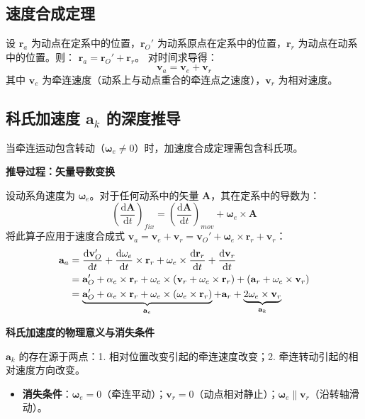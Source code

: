 \documentclass[12pt,a4paper]{article}
\newcommand{\vect}[1]{\mathbf{#1}}                   %
\newcommand{\der}[2]{\frac{\mathrm{d} #1}{\mathrm{d} #2}}  %
\begin{document}
\subsection{速度合成定理}
设 $\vect{r}_a$ 为动点在定系中的位置，$\vect{r}_O'$ 为动系原点在定系中的位置，$\vect{r}_r$ 为动点在动系中的位置。则：
$\vect{r}_a = \vect{r}_O' + \vect{r}_r$。
对时间求导得：
\begin{equation}
    \vect{v}_a = \vect{v}_e + \vect{v}_r
\end{equation}
其中 $\vect{v}_e$ 为牵连速度（动系上与动点重合的牵连点之速度），$\vect{v}_r$ 为相对速度。

\subsection{科氏加速度 $\vect{a}_k$ 的深度推导}

当牵连运动包含转动（$\vect{\omega}_e \neq 0$）时，加速度合成定理需包含科氏项。

\textbf{推导过程：矢量导数变换}

设动系角速度为 $\vect{\omega}_e$。对于任何动系中的矢量 $\vect{A}$，其在定系中的导数为：
\begin{equation}
    \left( \der{\vect{A}}{t} \right)_{fix} = \left( \der{\vect{A}}{t} \right)_{mov} + \vect{\omega}_e \times \vect{A}
\end{equation}
将此算子应用于速度合成式 $\vect{v}_a = \vect{v}_e + \vect{v}_r = \vect{v}_O' + \vect{\omega}_e \times \vect{r}_r + \vect{v}_r$：
\begin{align}
    \vect{a}_a &= \der{\vect{v}_O'}{t} + \der{\vect{\omega}_e}{t} \times \vect{r}_r + \vect{\omega}_e \times \der{\vect{r}_r}{t} + \der{\vect{v}_r}{t} \notag \\
    &= \vect{a}_O' + \vect{\alpha}_e \times \vect{r}_r + \vect{\omega}_e \times (\vect{v}_r + \vect{\omega}_e \times \vect{r}_r) + (\vect{a}_r + \vect{\omega}_e \times \vect{v}_r) \notag \\
    &= \underbrace{\vect{a}_O' + \vect{\alpha}_e \times \vect{r}_r + \vect{\omega}_e \times (\vect{\omega}_e \times \vect{r}_r)}_{\vect{a}_e} + \vect{a}_r + \underbrace{2\vect{\omega}_e \times \vect{v}_r}_{\vect{a}_k}
\end{align}

\textbf{科氏加速度的物理意义与消失条件}

$\vect{a}_k$ 的存在源于两点：1. 相对位置改变引起的牵连速度改变；2. 牵连转动引起的相对速度方向改变。
\begin{itemize}
    \item \textbf{消失条件}：$\vect{\omega}_e = 0$（牵连平动）；$\vect{v}_r = 0$（动点相对静止）；$\vect{\omega}_e \parallel \vect{v}_r$（沿转轴滑动）。
\end{itemize}
\end{document}
